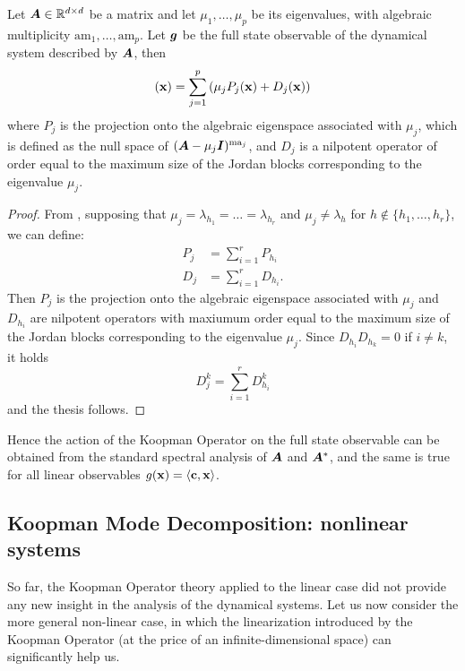 \begin{corollary}
Let $\vb*{A}\in\mathbb{R}^{d\times d}$ be a matrix and let $\mu_1, \dots, \mu_p$ be its eigenvalues, with algebraic multiplicity $\mathrm{am}_1, \dots, \mathrm{am}_p$. Let $\vb*{g}$ be the full state observable of the dynamical system described by $\vb*{A}$, then
\begin{equation*}
    [\mathcal{K}\vb{g}](\vb{x}) = \sum_{j = 1}^{p} \left(\mu_j P_j(\vb{x}) + D_j(\vb{x}) \right)
\end{equation*}
where $P_j$ is the projection onto the algebraic eigenspace associated with $\mu_j$, which is defined as the null space of $(\vb*{A} - \mu_j\vb*{I})^{\mathrm{ma}_j}$, and $D_j$ is a nilpotent operator of order equal to the maximum size of the Jordan blocks corresponding to the eigenvalue $\mu_j$. 
\end{corollary}
\begin{proof}
From , supposing that $\mu_j = \lambda_{h_1} = \dots = \lambda_{h_r}$ and $\mu_j \neq \lambda_{h}$ for $h\notin\{h_1,\dots, h_r\}$, we can define:
\begin{equation*}
    \begin{split}
        P_j &= \sum_{i=1}^r P_{h_i}\\
        D_j &= \sum_{i=1}^r D_{h_i}.
    \end{split}
\end{equation*}
Then $P_j$ is the projection onto the algebraic eigenspace associated with $\mu_j$ and $D_{h_i}$ are nilpotent operators with maxiumum order equal to the maximum size of the Jordan blocks corresponding to the eigenvalue $\mu_j$. Since $D_{h_i}D_{h_k} = 0$ if $i\neq k$, it holds
\begin{equation*}
    D_j^k = \sum_{i=1}^r D_{h_i}^k
\end{equation*}
and the thesis follows.
\end{proof}

Hence the action of the Koopman Operator on the full state observable can be obtained from the standard spectral analysis of $\vb*{A}$ and $\vb*{A}^*$, and the same is true for all linear observables $g(\vb{x}) = \langle \vb{c}, \vb{x} \rangle$.

\subsection{Koopman Mode Decomposition: nonlinear systems}
So far, the Koopman Operator theory applied to the linear case did not provide any new insight in the analysis of the dynamical systems. Let us now consider the more general non-linear case, in which the linearization introduced by the Koopman Operator (at the price of an infinite-dimensional space) can significantly help us.

